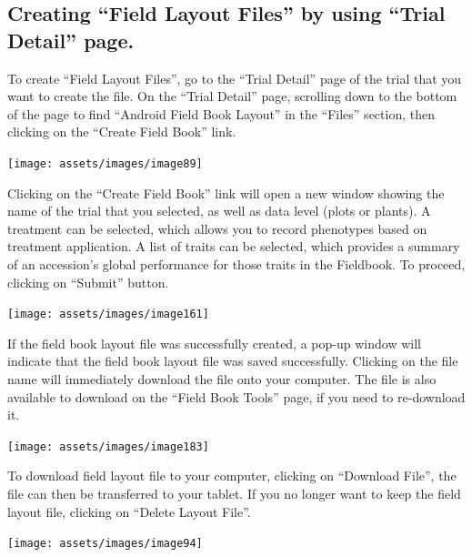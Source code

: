 \documentclass[
  12pt,
]{book}
\begin{document}
\hypertarget{creating-field-layout-files-by-using-trial-detail-page.}{%
\subsection{Creating ``Field Layout Files'' by using ``Trial Detail'' page.}\label{creating-field-layout-files-by-using-trial-detail-page.}}

To create ``Field Layout Files'', go to the ``Trial Detail'' page of the trial that you want to create the file. On the ``Trial Detail'' page, scrolling down to the bottom of the page to find ``Android Field Book Layout'' in the ``Files'' section, then clicking on the ``Create Field Book'' link.

\begin{center}\texttt{[image: assets/images/image89]} \end{center}

Clicking on the ``Create Field Book'' link will open a new window showing the name of the trial that you selected, as well as data level (plots or plants). A treatment can be selected, which allows you to record phenotypes based on treatment application. A list of traits can be selected, which provides a summary of an accession's global performance for those traits in the Fieldbook. To proceed, clicking on ``Submit'' button.

\begin{center}\texttt{[image: assets/images/image161]} \end{center}

If the field book layout file was successfully created, a pop-up window will indicate that the field book layout file was saved successfully. Clicking on the file name will immediately download the file onto your computer. The file is also available to download on the ``Field Book Tools'' page, if you need to re-download it.

\begin{center}\texttt{[image: assets/images/image183]} \end{center}

To download field layout file to your computer, clicking on ``Download File'', the file can then be transferred to your tablet. If you no longer want to keep the field layout file, clicking on ``Delete Layout File''.

\begin{center}\texttt{[image: assets/images/image94]} \end{center}
\end{document}
